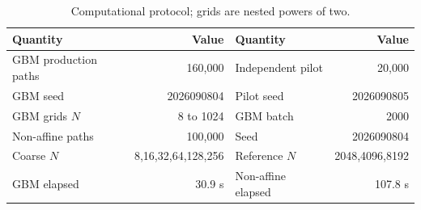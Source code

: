 \begin{table}[H]\centering\small
\caption{Computational protocol; grids are nested powers of two.}
\label{tab:protocol}
\begin{tabular}{lrlr}\toprule
Quantity & Value & Quantity & Value\\\midrule
GBM production paths & 160,000 & Independent pilot & 20,000\\
GBM seed & 2026090804 & Pilot seed & 2026090805\\
GBM grids $N$ & 8 to 1024 & GBM batch & 2000\\
Non-affine paths & 100,000 & Seed & 2026090804\\
Coarse $N$ & 8,16,32,64,128,256 & Reference $N$ & 2048,4096,8192\\
GBM elapsed & 30.9 s & Non-affine elapsed & 107.8 s\\
\bottomrule\end{tabular}
\end{table}
